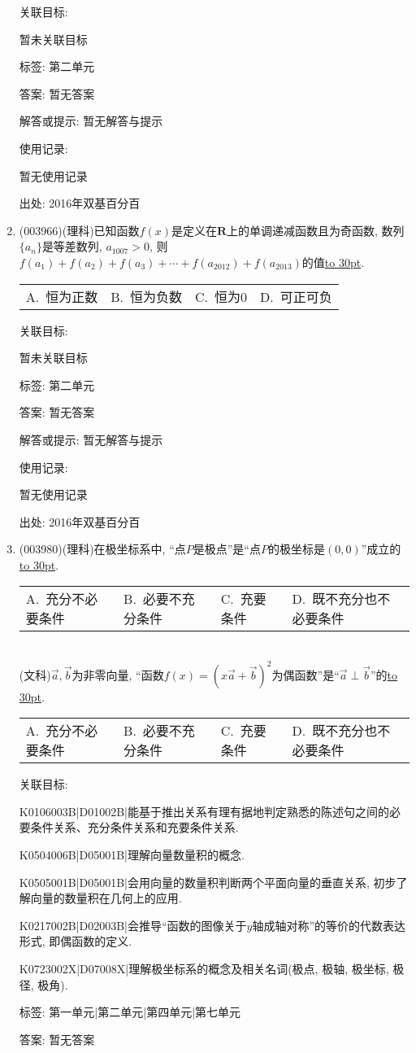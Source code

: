 \documentclass[10pt,a4paper]{article}
\newcommand{\blank}[1]{\underline{\hbox to #1pt{}}}
\newcommand{\fourch}[4]{\par\begin{tabular}{p{.23\textwidth}p{.23\textwidth}p{.23\textwidth}p{.23\textwidth}}
A.~#1 &B.~#2& C.~#3& D.~#4
\end{tabular}}
\begin{document}
\begin{enumerate}[1.]
关联目标:

暂未关联目标



标签: 第二单元

答案: 暂无答案

解答或提示: 暂无解答与提示

使用记录:

暂无使用记录


出处: 2016年双基百分百
\item { (003966)}(理科)已知函数$f(x)$是定义在$\mathbf{R}$上的单调递减函数且为奇函数, 数列$\{a_n\}$是等差数列, $a_{1007}>0$, 则$f(a_1)+f(a_2)+f(a_3)+\cdots+f(a_{2012})+f(a_{2013})$的值\blank{30}.
\fourch{恒为正数}{恒为负数}{恒为$0$}{可正可负}


关联目标:

暂未关联目标



标签: 第二单元

答案: 暂无答案

解答或提示: 暂无解答与提示

使用记录:

暂无使用记录


出处: 2016年双基百分百
\item { (003980)}(理科)在极坐标系中, ``点$P$是极点''是``点$P$的极坐标是$(0,0)$''成立的\blank{30}.
\fourch{充分不必要条件}{必要不充分条件}{充要条件}{既不充分也不必要条件}\\
(文科)$\overrightarrow a,\overrightarrow b$为非零向量, ``函数$f(x)=(x\overrightarrow a+\overrightarrow b)^2$为偶函数''是``$\overrightarrow a\perp \overrightarrow b$''的\blank{30}.
\fourch{充分不必要条件}{必要不充分条件}{充要条件}{既不充分也不必要条件}


关联目标:

K0106003B|D01002B|能基于推出关系有理有据地判定熟悉的陈述句之间的必要条件关系、充分条件关系和充要条件关系.

K0504006B|D05001B|理解向量数量积的概念.

K0505001B|D05001B|会用向量的数量积判断两个平面向量的垂直关系, 初步了解向量的数量积在几何上的应用.

K0217002B|D02003B|会推导``函数的图像关于$y$轴成轴对称''的等价的代数表达形式, 即偶函数的定义.

K0723002X|D07008X|理解极坐标系的概念及相关名词(极点, 极轴, 极坐标, 极径, 极角).



标签: 第一单元|第二单元|第四单元|第七单元

答案: 暂无答案


\end{enumerate}
\end{document}

